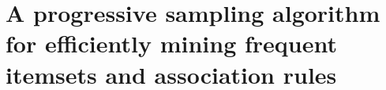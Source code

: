 \chapter{A progressive sampling algorithm for efficiently mining frequent
itemsets and association rules}\label{ch:shatterfi}


